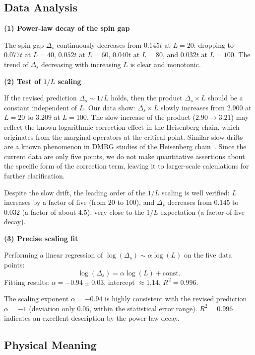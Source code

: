 \documentclass[prb,reprint,twocolumn,superscriptaddress]{revtex4-2}
\begin{document}
\subsection{Data Analysis}

\textbf{(1) Power-law decay of the spin gap}

The spin gap $\Delta_s$ continuously decreases from $0.145t$ at $L = 20$: dropping to $0.077t$ at $L = 40$, $0.052t$ at $L = 60$, $0.040t$ at $L = 80$, and $0.032t$ at $L = 100$. The trend of $\Delta_s$ decreasing with increasing $L$ is clear and monotonic.

\textbf{(2) Test of $1/L$ scaling}

If the revised prediction $\Delta_s \sim 1/L$ holds, then the product $\Delta_s \times L$ should be a constant independent of $L$. Our data show: $\Delta_s \times L$ slowly increases from $2.900$ at $L = 20$ to $3.209$ at $L = 100$. The slow increase of the product ($2.90 \to 3.21$) may reflect the known logarithmic correction effect in the Heisenberg chain, which originates from the marginal operators at the critical point. Similar slow drifts are a known phenomenon in DMRG studies of the Heisenberg chain~\cite{Affleck1989,Giamarchi2004}. Since the current data are only five points, we do not make quantitative assertions about the specific form of the correction term, leaving it to larger-scale calculations for further clarification.

Despite the slow drift, the leading order of the $1/L$ scaling is well verified: $L$ increases by a factor of five (from $20$ to $100$), and $\Delta_s$ decreases from $0.145$ to $0.032$ (a factor of about $4.5$), very close to the $1/L$ expectation (a factor-of-five decay).

\textbf{(3) Precise scaling fit}

Performing a linear regression of $\log(\Delta_s) \sim \alpha \log(L)$ on the five data points:
\[
\log(\Delta_s) = \alpha \log(L) + \text{const}.
\]
Fitting results: $\alpha = -0.94 \pm 0.03$, intercept $\approx 1.14$, $R^2 = 0.996$.

The scaling exponent $\alpha = -0.94$ is highly consistent with the revised prediction $\alpha = -1$ (deviation only $0.05$, within the statistical error range). $R^2 = 0.996$ indicates an excellent description by the power-law decay.

\subsection{Physical Meaning}
\end{document}
